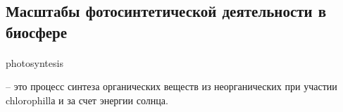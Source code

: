 





\subsection*{Масштабы фотосинтетической деятельности в биосфере}

\paragraph*{}\hypertarget{photosyntesis}{\Gls{photosyntesis}} -- это процесс синтеза органических веществ из неорганических при участии \gls{chlorophill}а и за счет энергии солнца.

